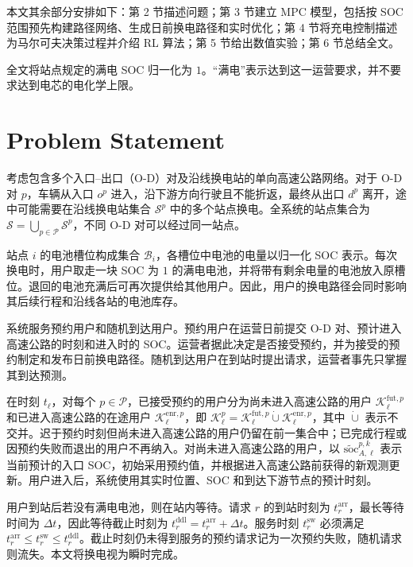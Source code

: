 \documentclass[12pt,a4paper,UTF8]{ctexart}
\begin{document}

本文其余部分安排如下：第 2 节描述问题；第 3 节建立 MPC 模型，包括按 SOC 范围预先构建路径网络、生成日前换电路径和实时优化；第 4 节将充电控制描述为马尔可夫决策过程并介绍 RL 算法；第 5 节给出数值实验；第 6 节总结全文。

全文将站点规定的满电 SOC 归一化为 $1$。“满电”表示达到这一运营要求，并不要求达到电芯的电化学上限。






\section{Problem Statement}

考虑包含多个入口--出口（O-D）对及沿线换电站的单向高速公路网络。对于 O-D 对 $p$，车辆从入口 $o^p$ 进入，沿下游方向行驶且不能折返，最终从出口 $d^p$ 离开，途中可能需要在沿线换电站集合 $\mathcal S^p$ 中的多个站点换电。全系统的站点集合为 $\mathcal S=\bigcup_{p\in\mathcal P}\mathcal S^p$，不同 O-D 对可以经过同一站点。

站点 $i$ 的电池槽位构成集合 $\mathcal B_i$，各槽位中电池的电量以归一化 SOC 表示。每次换电时，用户取走一块 SOC 为 $1$ 的满电电池，并将带有剩余电量的电池放入原槽位。退回的电池充满后可再次提供给其他用户。因此，用户的换电路径会同时影响其后续行程和沿线各站的电池库存。

系统服务预约用户和随机到达用户。预约用户在运营日前提交 O-D 对、预计进入高速公路的时刻和进入时的 SOC。运营者据此决定是否接受预约，并为接受的预约制定和发布日前换电路径。随机到达用户在到站时提出请求，运营者事先只掌握其到达预测。

在时刻 $t_\ell$，对每个 $p\in\mathcal P$，已接受预约的用户分为尚未进入高速公路的用户 $\mathcal K_\ell^{\mathrm{fut},p}$ 和已进入高速公路的在途用户 $\mathcal K_\ell^{\mathrm{enr},p}$，即 $\mathcal K_\ell^p=\mathcal K_\ell^{\mathrm{fut},p}\mathbin{\dot\cup}\mathcal K_\ell^{\mathrm{enr},p}$，其中 $\dot\cup$ 表示不交并。迟于预约时刻但尚未进入高速公路的用户仍留在前一集合中；已完成行程或因预约失败而退出的用户不再纳入。对尚未进入高速公路的用户，以 $\widetilde{\mathrm{soc}}_{A,\ell}^{p,k}$ 表示当前预计的入口 SOC，初始采用预约值，并根据进入高速公路前获得的新观测更新。用户进入后，系统使用其实时位置、SOC 和到达下游节点的预计时刻。

用户到站后若没有满电电池，则在站内等待。请求 $r$ 的到站时刻为 $t_r^{\mathrm{arr}}$，最长等待时间为 $\Delta t$，因此等待截止时刻为 $t_r^{\mathrm{ddl}}=t_r^{\mathrm{arr}}+\Delta t$。服务时刻 $t_r^{\mathrm{sw}}$ 必须满足 $t_r^{\mathrm{arr}}\le t_r^{\mathrm{sw}}\le t_r^{\mathrm{ddl}}$。截止时刻仍未得到服务的预约请求记为一次预约失败，随机请求则流失。本文将换电视为瞬时完成。
\end{document}
